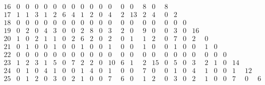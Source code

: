 \begin{landscape}
\[\begin{array}{c|ccccccccccccccccccccccccc}
16&  0&  0&  0&  0&  0&  0&  0&  0&  0&  0&  0&  0&  0&  8&  0&  8&   &   &   &   &   &   &   &   &   \\
17&  1&  1&  3&  1&  2&  6&  4&  1&  2&  0&  4&  2& 13&  2&  4&  0&  2&   &   &   &   &   &   &   &   \\
18&  0&  0&  0&  0&  0&  0&  0&  0&  0&  0&  0&  0&  0&  0&  0&  0&  0&  0&   &   &   &   &   &   &   \\
19&  0&  2&  0&  4&  3&  0&  0&  2&  8&  0&  3&  2&  0&  9&  0&  0&  3&  0& 16&   &   &   &   &   &   \\
20&  1&  0&  2&  1&  1&  0&  2&  6&  2&  0&  2&  0&  1&  1&  2&  0&  7&  0&  2&  0&   &   &   &   &   \\
21&  0&  1&  0&  0&  1&  0&  0&  1&  0&  0&  1&  0&  0&  1&  0&  0&  1&  0&  0&  1&  0&   &   &   &   \\
22&  0&  0&  0&  0&  0&  0&  0&  0&  0&  0&  0&  0&  0&  0&  0&  0&  0&  0&  0&  0&  0&  0&   &   &   \\
23&  1&  2&  3&  1&  5&  0&  7&  2&  2&  0& 10&  6&  1&  2& 15&  0&  5&  0&  3&  2&  1&  0& 14&   &   \\
24&  0&  1&  0&  4&  1&  0&  0&  1&  4&  0&  1&  0&  0&  7&  0&  0&  1&  0&  4&  1&  0&  0&  1& 12&   \\
25&  0&  1&  2&  0&  3&  0&  2&  1&  0&  0&  7&  6&  0&  1&  2&  0&  3&  0&  2&  1&  0&  0&  7&  0&  6\\
\end{array}
\]


\end{landscape}
